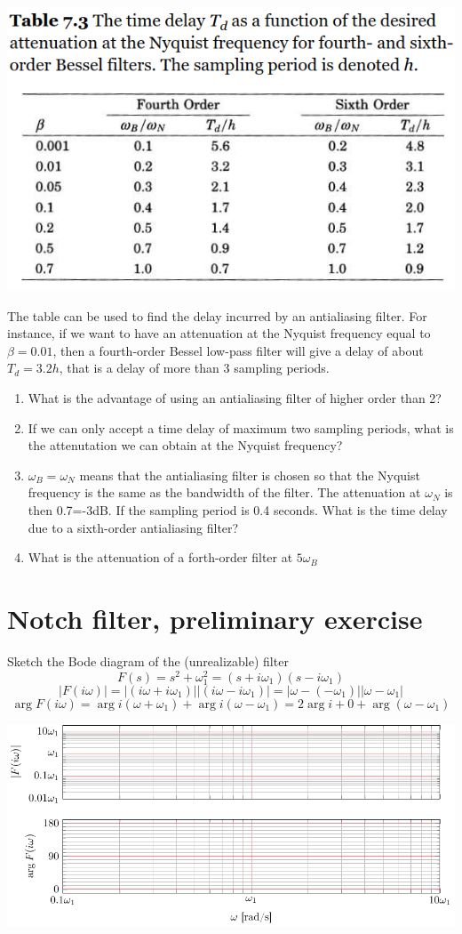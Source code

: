 \documentclass[letterpaper]{scrartcl}
\begin{document}
\begin{center}
\includegraphics[width=0.4\linewidth]{../figures/Astrom-fig73.png}
\end{center}
The table can be used to find the delay incurred by an antialiasing filter. For instance, if we want to have an attenuation at the Nyquist frequency equal to \(\beta = 0.01\), then a fourth-order Bessel low-pass filter will give a delay of about \(T_d = 3.2 h\), that is a delay of more than 3 sampling periods. 
\begin{enumerate}
\item What is the advantage of using an antialiasing filter of higher order than 2?
\item If we can only accept a time delay of maximum two sampling periods, what is the attenutation we can obtain at the Nyquist frequency?
\item \(\omega_B = \omega_N\) means that the antialiasing filter is chosen so that the Nyquist frequency is the same as the bandwidth of the filter. The attenuation at \(\omega_N\) is then 0.7=-3dB. If the sampling period is 0.4 seconds. What is the time delay due to a sixth-order antialiasing filter?
\item What is the attenuation of a forth-order filter at \(5\omega_B\)
\end{enumerate}

\clearpage


\section*{Notch filter, preliminary exercise}
\label{sec-3}
Sketch the Bode diagram of the (unrealizable) filter
\[ F(s) = s^2 + \omega_1^2 = (s+i\omega_1)(s-i\omega_1)\]
\[ |F(i\omega)| = |(i\omega + i\omega_1)||(i\omega - i\omega_1)| = |\omega - (-\omega_1)||\omega - \omega_1|\]
\[ \arg F(i\omega) = \arg i(\omega + \omega_1) + \arg i(\omega -\omega_1) = 2\arg i + 0 + \arg(\omega - \omega_1) \]
\begin{center}
\includegraphics[width=0.85\linewidth]{../figures/bode-w1-empty}
\end{center}
\end{document}
